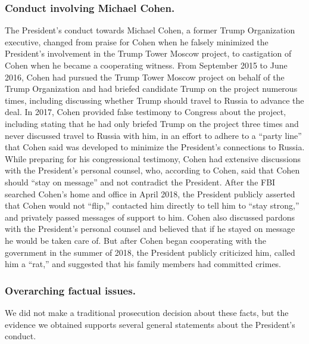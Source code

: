 \subsubsection*{Conduct involving Michael Cohen.}

The President’s conduct towards Michael Cohen, a former Trump Organization executive, changed from praise for Cohen when he falsely minimized the President’s involvement in the Trump Tower Moscow project, to castigation of Cohen when he became a cooperating witness.
From September 2015 to June 2016, Cohen had pursued the Trump Tower Moscow project on behalf of the Trump Organization and had briefed candidate Trump on the project numerous times, including discussing whether Trump should travel to Russia to advance the deal.
In 2017, Cohen provided false testimony to Congress about the project, including stating that he had only briefed Trump on the project three times and never discussed travel to Russia with him, in an effort to adhere to a “party line” that Cohen said was developed to minimize the President’s connections to Russia.
While preparing for his congressional testimony, Cohen had extensive discussions with the President’s personal counsel, who, according to Cohen, said that Cohen should “stay on message” and not contradict the President.
After the FBI searched Cohen’s home and office in April 2018, the President publicly asserted that Cohen would not “flip,” contacted him directly to tell him to “stay strong,” and privately passed messages of support to him.
Cohen also discussed pardons with the President’s personal counsel and believed that if he stayed on message he would be taken care of.
But after Cohen began cooperating with the government in the summer of 2018, the President publicly criticized him, called him a “rat,” and suggested that his family members had committed crimes.

\subsubsection*{Overarching factual issues.}

We did not make a traditional prosecution decision about these facts, but the evidence we obtained supports several general statements about the President’s conduct.

